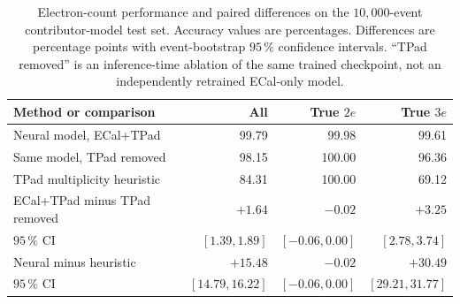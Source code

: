 \begin{table}[htbp]
    \centering
    \small
    \setlength{\tabcolsep}{5pt}
    \caption{Electron-count performance and paired differences on the
    \(10{,}000\)-event contributor-model test set. Accuracy values are
    percentages. Differences are percentage points with event-bootstrap
    \(95\,\%\) confidence intervals. ``TPad removed'' is an inference-time
    ablation of the same trained checkpoint, not an independently retrained
    ECal-only model.}
    \label{tab:results_tpad_count}
    \begin{tabular}{lrrr}
        \hline
        Method or comparison & All & True \(2e\) & True \(3e\) \\
        \hline
        Neural model, ECal+TPad & 99.79 & 99.98 & 99.61 \\
        Same model, TPad removed & 98.15 & 100.00 & 96.36 \\
        TPad multiplicity heuristic & 84.31 & 100.00 & 69.12 \\
        \hline
        ECal+TPad minus TPad removed & \(+1.64\) & \(-0.02\) & \(+3.25\) \\
        \(95\,\%\) CI & \([1.39,1.89]\) & \([-0.06,0.00]\) & \([2.78,3.74]\) \\
        Neural minus heuristic & \(+15.48\) & \(-0.02\) & \(+30.49\) \\
        \(95\,\%\) CI & \([14.79,16.22]\) & \([-0.06,0.00]\) & \([29.21,31.77]\) \\
        \hline
    \end{tabular}
\end{table}
